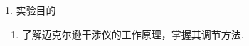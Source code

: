\documentclass{../../../../Cls/SDU/ExpReport/Physics/Physics}
\begin{document}
\sduDate{\today}
\begin{sdu}
    1. 实验目的
    \begin{enumerate}[label=（\arabic*）]
        \item 了解迈克尔逊干涉仪的工作原理，掌握其调节方法.
    \end{enumerate}
\end{sdu}
\end{document}
